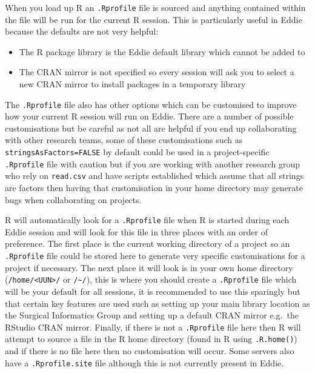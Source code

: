 \documentclass[
]{book}
\providecommand{\tightlist}{%
  \setlength{\itemsep}{0pt}\setlength{\parskip}{0pt}}
\begin{document}
When you load up R an \texttt{.Rprofile} file is sourced and anything contained within the file will be run for the current R session. This is particularly useful in Eddie because the defaults are not very helpful:

\begin{itemize}
\tightlist
\item
  The R package library is the Eddie default library which cannot be added to
\item
  The CRAN mirror is not specified so every session will ask you to select a new CRAN mirror to install packages in a temporary library
\end{itemize}

The \texttt{.Rprofile} file also has other options which can be customised to improve how your current R session will run on Eddie. There are a number of possible customisations but be careful as not all are helpful if you end up collaborating with other research teams, some of these customisations such as \texttt{stringsAsFactors=FALSE} by default could be used in a project-specific \texttt{.Rprofile} file with caution but if you are working with another research group who rely on \texttt{read.csv} and have scripts established which assume that all strings are factors then having that customisation in your home directory may generate bugs when collaborating on projects.

R will automatically look for a \texttt{.Rprofile} file when R is started during each Eddie session and will look for this file in three places with an order of preference. The first place is the current working directory of a project so an \texttt{.Rprofile} file could be stored here to generate very specific customisations for a project if necessary. The next place it will look is in your own home directory (\texttt{/home/\textless{}UUN\textgreater{}/} or \texttt{/\textasciitilde{}/}), this is where you should create a \texttt{.Rprofile} file which will be your default for all sessions, it is recommended to use this sparingly but that certain key features are used such as setting up your main library location as the Surgical Informatics Group and setting up a default CRAN mirror e.g.~the RStudio CRAN mirror. Finally, if there is not a \texttt{.Rprofile} file here then R will attempt to source a file in the R home directory (found in R using \texttt{.R.home()}) and if there is no file here then no customisation will occur. Some servers also have a \texttt{.Rprofile.site} file although this is not currently present in Eddie.
\end{document}
